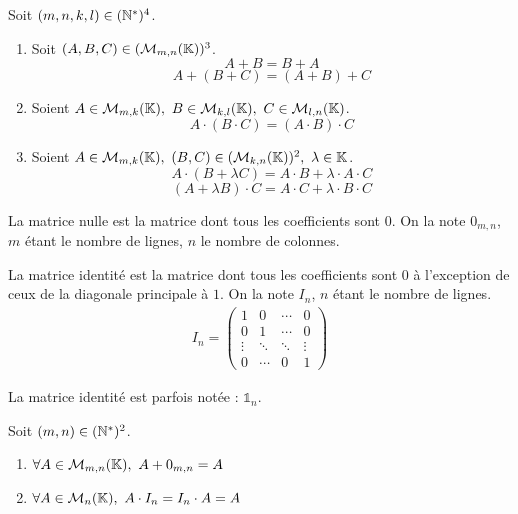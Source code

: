 \begin{proposition}
	Soit $(m, n, k, l) \in (\mathbb{N}^*)^4$.
	\begin{enumerate}
		\item Soit $(A, B, C) \in (\mathcal{M}_{m,n} (\mathbb{K}))^3$.
		\[A + B = B + A\]
		\[A + (B + C) = (A + B) + C\]
		\item Soient $A \in \mathcal{M}_{m, k}(\K),\ B \in \mathcal{M}_{k, l}(\K),\ C \in \mathcal{M}_{l, n}(\K)$.
		\[A \cdot (B \cdot C) = (A \cdot B) \cdot C\]
		\item Soient $A \in \mathcal{M}_{m, k}(\K),\ (B, C) \in (\mathcal{M}_{k, n}(\K))^2,\ \lambda \in \K$.
		\[A \cdot (B + \lambda C) = A \cdot B + \lambda \cdot A \cdot C\]
		\[(A + \lambda B) \cdot C = A \cdot C + \lambda \cdot B \cdot C\]
	\end{enumerate}
\end{proposition}

\begin{definition}
	La matrice nulle est la matrice dont tous les coefficients sont $0$. On la note $0_{m,n}$, $m$ étant le nombre de lignes, $n$ le nombre de colonnes. 
\end{definition}

\begin{definition}
	La matrice identité est la matrice dont tous les coefficients sont $0$ à l'exception de ceux de la diagonale principale à $1$. On la note $I_n$, $n$ étant le nombre de lignes.
	\begin{align*}
		I_n = 
		\begin{pmatrix}
			1 & 0 & \cdots & 0 \\
			0 & 1 & \cdots & 0 \\
			\vdots & \ddots & \ddots & \vdots \\
			0 & \cdots & 0 & 1
		\end{pmatrix}
	\end{align*}
\end{definition}

\begin{remark}
    La matrice identité est parfois notée : $\mathds{1}_n$.
\end{remark}

\begin{lemma}
	Soit $(m,n) \in (\mathbb{N}^*)^2$.
	\begin{multicols}{2}
	    \begin{enumerate}
    		\item $\forall A \in \mathcal{M}_{m, n}(\K),\ A + 0_{m,n} = A$
    		\item $\forall A \in \mathcal{M}_{n}(\mathbb{K}),\ A \cdot I_n = I_n \cdot A = A$
    	\end{enumerate}
	\end{multicols}
\end{lemma}

